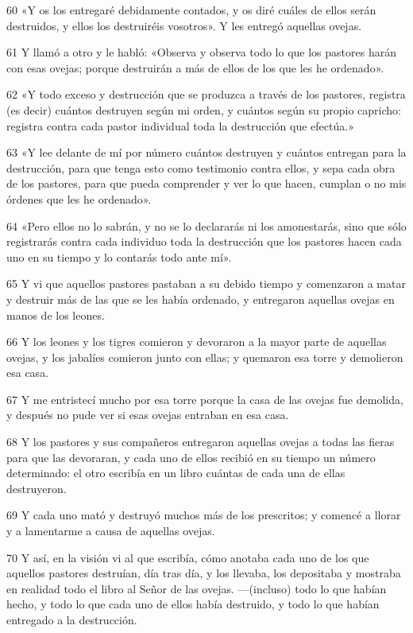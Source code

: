 \par 60 «Y os los entregaré debidamente contados, y os diré cuáles de ellos serán destruidos, y ellos los destruiréis vosotros». Y les entregó aquellas ovejas.
\par 61 Y llamó a otro y le habló: «Observa y observa todo lo que los pastores harán con esas ovejas; porque destruirán a más de ellos de los que les he ordenado».
\par 62 «Y todo exceso y destrucción que se produzca a través de los pastores, registra (es decir) cuántos destruyen según mi orden, y cuántos según su propio capricho: registra contra cada pastor individual toda la destrucción que efectúa.»
\par 63 «Y lee delante de mí por número cuántos destruyen y cuántos entregan para la destrucción, para que tenga esto como testimonio contra ellos, y sepa cada obra de los pastores, para que pueda comprender y ver lo que hacen, cumplan o no mis órdenes que les he ordenado».
\par 64 «Pero ellos no lo sabrán, y no se lo declararás ni los amonestarás, sino que sólo registrarás contra cada individuo toda la destrucción que los pastores hacen cada uno en su tiempo y lo contarás todo ante mí».
\par 65 Y vi que aquellos pastores pastaban a su debido tiempo y comenzaron a matar y destruir más de las que se les había ordenado, y entregaron aquellas ovejas en manos de los leones.
\par 66 Y los leones y los tigres comieron y devoraron a la mayor parte de aquellas ovejas, y los jabalíes comieron junto con ellas; y quemaron esa torre y demolieron esa casa.
\par 67 Y me entristecí mucho por esa torre porque la casa de las ovejas fue demolida, y después no pude ver si esas ovejas entraban en esa casa.
\par 68 Y los pastores y sus compañeros entregaron aquellas ovejas a todas las fieras para que las devoraran, y cada uno de ellos recibió en su tiempo un número determinado: el otro escribía en un libro cuántas de cada una de ellas destruyeron.
\par 69 Y cada uno mató y destruyó muchos más de los prescritos; y comencé a llorar y a lamentarme a causa de aquellas ovejas.
\par 70 Y así, en la visión vi al que escribía, cómo anotaba cada uno de los que aquellos pastores destruían, día tras día, y los llevaba, los depositaba y mostraba en realidad todo el libro al Señor de las ovejas. —(incluso) todo lo que habían hecho, y todo lo que cada uno de ellos había destruido, y todo lo que habían entregado a la destrucción.
